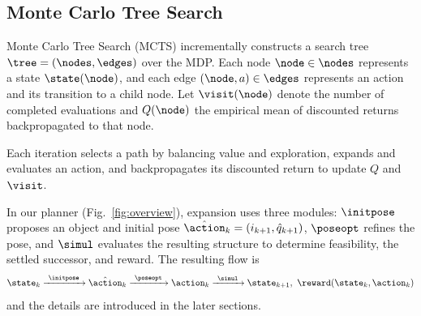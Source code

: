\subsection{Monte Carlo Tree Search}

Monte Carlo Tree Search (MCTS) incrementally constructs a search tree $\tree=(\nodes,\edges)$ over the MDP.
Each node $\node\in\nodes$ represents a state $\state(\node)$, and each edge $(\node,a)\in\edges$ represents an action and its transition to a child node.
Let $\visit(\node)$ denote the number of completed evaluations and $Q(\node)$ the empirical mean of discounted returns backpropagated to that node.

Each iteration selects a path by balancing value and exploration, expands and evaluates an action, and backpropagates its discounted return to update $Q$ and $\visit$.

In our planner (Fig.~\ref{fig:overview}), expansion uses three modules: $\initpose$ proposes an object and initial pose $\hat{\action}_k=(i_{k+1},\hat q_{k+1})$, $\poseopt$ refines the pose, and $\simul$ evaluates the resulting structure to determine feasibility, the settled successor, and reward.
The resulting flow is
\begin{equation*}
\state_k
\xrightarrow{\ \initpose\ }
\hat{\action}_k
\xrightarrow{\ \poseopt\ }
\action_k
\xrightarrow{\ \simul\ }
\state_{k+1},\ \reward(\state_k,\action_k)
\end{equation*}
and the details are introduced in the later sections.
